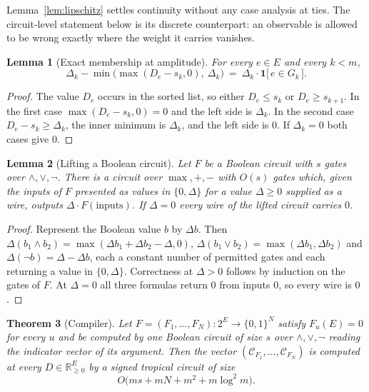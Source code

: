 \documentclass[11pt]{article}
\newtheorem{theorem}{Theorem}[section]
\newtheorem{lemma}[theorem]{Lemma}
\begin{document}
Lemma~\ref{lem:lipschitz} settles continuity without any case analysis at ties.
The circuit-level statement below is its discrete counterpart: an observable is
allowed to be wrong exactly where the weight it carries vanishes.

\begin{lemma}[Exact membership at amplitude]
\label{lem:bit}
For every $e\in E$ and every $k<m$,
\begin{equation}
  \Delta_k-\min\bigl(\max(D_{e}-s_k,0),\ \Delta_k\bigr)
  \ =\ \Delta_k\cdot\mathbf1\bigl[\,e\in G_k\,\bigr].
  \label{eq:bit}
\end{equation}
\end{lemma}

\begin{proof}
The value $D_e$ occurs in the sorted list, so either $D_e\le s_k$ or
$D_e\ge s_{k+1}$.  In the first case $\max(D_e-s_k,0)=0$ and the left side is
$\Delta_k$.  In the second case $D_e-s_k\ge\Delta_k$, the inner minimum is
$\Delta_k$, and the left side is $0$.  If $\Delta_k=0$ both cases give $0$.
\end{proof}

\begin{lemma}[Lifting a Boolean circuit]
\label{lem:lift}
Let $F$ be a Boolean circuit with $s$ gates over $\wedge,\vee,\neg$.  There is a
circuit over $\max,+,-$ with $O(s)$ gates which, given the inputs of $F$
presented as values in $\{0,\Delta\}$ for a value $\Delta\ge0$ supplied as a
wire, outputs $\Delta\cdot F(\text{inputs})$.  If $\Delta=0$ every wire of the
lifted circuit carries $0$.
\end{lemma}

\begin{proof}
Represent the Boolean value $b$ by $\Delta b$.  Then
$\Delta(b_1\wedge b_2)=\max(\Delta b_1+\Delta b_2-\Delta,0)$,
$\Delta(b_1\vee b_2)=\max(\Delta b_1,\Delta b_2)$ and
$\Delta(\neg b)=\Delta-\Delta b$, each a constant number of permitted gates and
each returning a value in $\{0,\Delta\}$.  Correctness at $\Delta>0$ follows by
induction on the gates of $F$.  At $\Delta=0$ all three formulas return $0$ from
inputs $0$, so every wire is $0$.
\end{proof}

\begin{theorem}[Compiler]
\label{thm:compiler}
Let $F=(F_1,\ldots,F_N)\colon2^{E}\to\{0,1\}^{N}$ satisfy $F_u(E)=0$ for every
$u$ and be computed by one Boolean circuit of size $s$ over $\wedge,\vee,\neg$
reading the indicator vector of its argument.  Then the vector
$(\mathcal C_{F_1},\ldots,\mathcal C_{F_N})$ is computed at every
$D\in\mathbb R_{\ge0}^{E}$ by a signed tropical circuit of size
\begin{equation}
  O\bigl(ms+mN+m^{2}+m\log^{2}m\bigr).
  \label{eq:compiler-size}
\end{equation}
\end{theorem}
\end{document}
